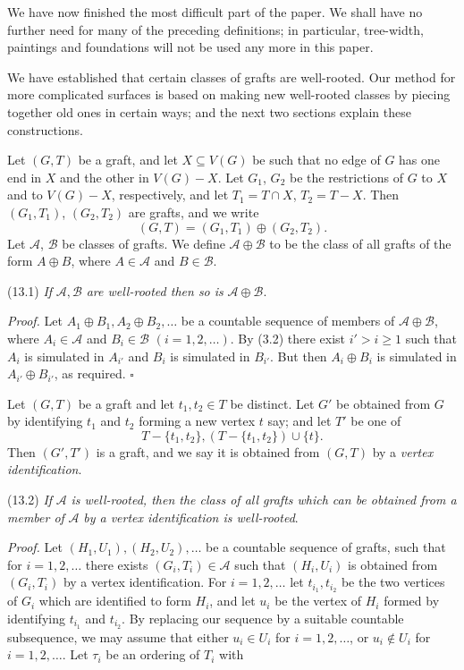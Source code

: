 
We have now finished the most difficult part of the paper. We shall have no further need for many of the preceding definitions; in particular, tree-width, paintings and foundations will not be used any more in this paper.

We have established that certain classes of grafts are well-rooted. Our method for more complicated surfaces is based on making new well-rooted classes by piecing together old ones in certain ways; and the next two sections explain these constructions.

Let $(G, T)$ be a graft, and let $X \subseteq V(G)$ be such that no edge of $G$ has one end in $X$ and the other in $V(G) - X$. Let $G_1$, $G_2$ be the restrictions of $G$ to $X$ and to $V(G) - X$, respectively, and let $T_1 = T \cap X$, $T_2 = T - X$. Then $(G_1, T_1)$, $(G_2, T_2)$ are grafts, and we write
\begin{equation*}
(G, T) = (G_1, T_1) \oplus (G_2, T_2).
\end{equation*}
Let $\mathscr{A}$, $\mathscr{B}$ be classes of grafts. We define $\mathscr{A} \oplus \mathscr{B}$ to be the class of all grafts of the form $A \oplus B$, where $A \in \mathscr{A}$ and $B \in \mathscr{B}$.

\stmt
(13.1) \textit{If} $\mathscr{A}, \mathscr{B}$ \textit{are well-rooted then so is} $\mathscr{A} \oplus \mathscr{B}$.

\textit{Proof.} Let $A_1 \oplus B_1, A_2 \oplus B_2, \dots$ be a countable sequence of members of $\mathscr{A} \oplus \mathscr{B}$, where $A_i \in \mathscr{A}$ and $B_i \in \mathscr{B}$ $(i = 1, 2, \dots)$. By (3.2) there exist $i' > i \ge 1$ such that $A_i$ is simulated in $A_{i'}$ and $B_i$ is simulated in $B_{i'}$. But then $A_i \oplus B_i$ is simulated in $A_{i'} \oplus B_{i'}$, as required. $\square$

Let $(G, T)$ be a graft and let $t_1, t_2 \in T$ be distinct. Let $G'$ be obtained from $G$ by identifying $t_1$ and $t_2$ forming a new vertex $t$ say; and let $T'$ be one of
\begin{equation*}
T - \{t_1, t_2\}, (T - \{t_1, t_2\}) \cup \{t\}.
\end{equation*}
Then $(G', T')$ is a graft, and we say it is obtained from $(G, T)$ by a \textit{vertex identification}.

\stmt
(13.2) \textit{If} $\mathscr{A}$ \textit{is well-rooted, then the class of all grafts which can be obtained from a member of} $\mathscr{A}$ \textit{by a vertex identification is well-rooted}.

\textit{Proof.} Let $(H_1, U_1), (H_2, U_2), \dots$ be a countable sequence of grafts, such that for $i = 1, 2, \dots$ there exists $(G_i, T_i) \in \mathscr{A}$ such that $(H_i, U_i)$ is obtained from $(G_i, T_i)$ by a vertex identification. For $i = 1, 2, \dots$ let $t_{i_1}, t_{i_2}$ be the two vertices of $G_i$ which are identified to form $H_i$, and let $u_i$ be the vertex of $H_i$ formed by identifying $t_{i_1}$ and $t_{i_2}$. By replacing our sequence by a suitable countable subsequence, we may assume that either $u_i \in U_i$ for $i = 1, 2, \dots$, or $u_i \notin U_i$ for $i = 1, 2, \dots.$ Let $\tau_i$ be an ordering of $T_i$ with
